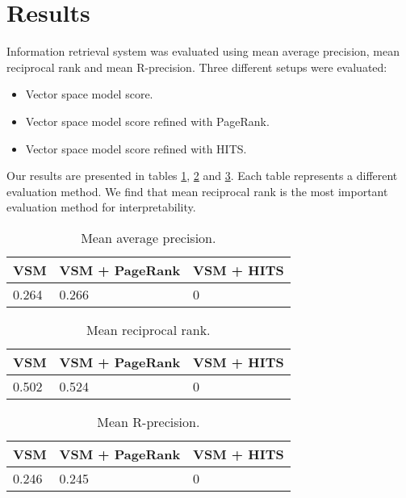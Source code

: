 \documentclass[10pt, a4paper]{article}
\begin{document}
\section{Results}
Information retrieval system was evaluated using mean average precision, mean reciprocal rank and mean R-precision. Three different setups were evaluated:
\begin{itemize}
\item Vector space model score.
\item Vector space model score refined with PageRank.
\item Vector space model score refined with HITS.
\end{itemize}

Our results are presented in tables \ref{tab:MAP}, \ref{tab:MRR} and \ref{tab:MR}. Each table represents a different evaluation method. We find that mean reciprocal rank is the most important evaluation method for interpretability.

\begin{table}
\caption{Mean average precision.}
\label{tab:MAP}
\begin{center}
\begin{tabular}{lll}
\toprule
VSM & VSM + PageRank & VSM + HITS \\
\midrule
0.264 & 0.266 & 0\\
\bottomrule
\end{tabular}
\end{center}
\end{table}

\begin{table}
\caption{Mean reciprocal rank.}
\label{tab:MRR}
\begin{center}
\begin{tabular}{lll}
\toprule
VSM & VSM + PageRank & VSM + HITS \\
\midrule
0.502 & 0.524 & 0\\
\bottomrule
\end{tabular}
\end{center}
\end{table}

\begin{table}
\caption{Mean R-precision.}
\label{tab:MR}
\begin{center}
\begin{tabular}{lll}
\toprule
VSM & VSM + PageRank & VSM + HITS \\
\midrule
0.246 & 0.245 & 0\\
\bottomrule
\end{tabular}
\end{center}
\end{table}
\end{document}
